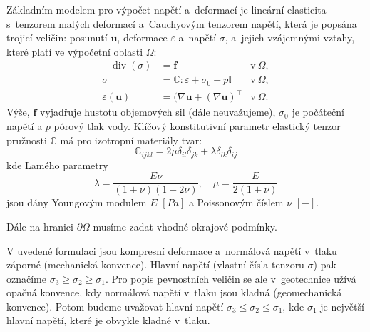 \documentclass{article}
\def\eps{\varepsilon}
\def\T{\intercal}
\def\div{\operatorname{div}}
\def\vc#1{\mathbf{\boldsymbol{#1}}}     %
\def\tn#1{{\mathbb{#1}}}    %
\begin{document}
Základním modelem pro výpočet napětí a~deformací je lineární elasticita s~tenzorem malých deformací a~Cauchyovým tenzorem napětí, která je popsána trojicí veličin: posunutí $\vc u$, deformace $\eps$ a~napětí $\sigma$, a~jejich vzájemnými vztahy, které platí ve výpočetní oblasti $\Omega$:
\begin{align*}
	- \div(\sigma) &= \vc f &\mbox{v} \ \Omega, \\
	\sigma &= \tn C : \eps + \sigma_0 + p\tn I  &\mbox{v} \ \Omega, \\
	\eps(\vc u) &= (\nabla \vc u + (\nabla \vc u)^\T &\mbox{v} \ \Omega.
\end{align*}
Výše, $\vc f$ vyjadřuje hustotu objemových sil (dále neuvažujeme), $\sigma_0$ je počáteční napětí a $p$ pórový tlak vody. 
Klíčový konstitutivní parametr elastický tenzor pružnosti $\tn C$ má pro izotropní materiály tvar:
\[
    \tn C_{ijkl} = 2\mu\delta_{il}\delta_{jk}+\lambda\delta_{lk}\delta_{ij}  
\]
kde Lamého parametry 
\[
  \lambda = \frac{E\nu}{(1+\nu)(1-2\nu)},\quad \mu=\frac{E}{2(1+\nu)}
\]
 jsou dány Youngovým modulem $E$ $[Pa]$ a Poissonovým číslem $\nu$ $[-]$.



Dále na hranici $\partial \Omega$ musíme zadat vhodné okrajové podmínky. 

V uvedené formulaci jsou kompresní deformace a~normálová napětí v~tlaku záporné (mechanická konvence). 
Hlavní napětí (vlastní čísla tenzoru $\sigma$) pak označíme $\sigma_3 \geq \sigma_2 \geq \sigma_1$.
Pro popis pevnostních veličin se ale v~geotechnice užívá opačná konvence, kdy normálová napětí v~tlaku jsou kladná (geomechanická konvence).
Potom budeme uvažovat hlavní napětí $\sigma_3 \leq \sigma_2 \leq \sigma_1$, kde $\sigma_1$ je největší hlavní napětí, které je obvykle kladné v~tlaku.
\end{document}
